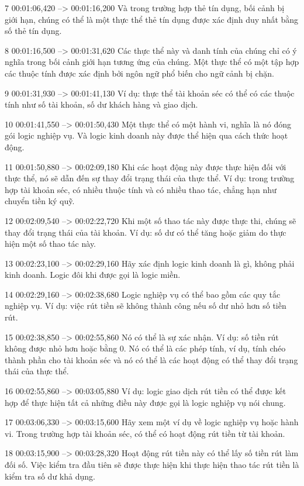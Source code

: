7
00:01:06,420 --> 00:01:16,200
Và trong trường hợp thẻ tín dụng, bối cảnh bị giới hạn, chúng có thể là một thực thể thẻ tín dụng được xác định duy nhất bằng số thẻ tín dụng.

8
00:01:16,500 --> 00:01:31,620
Các thực thể này và danh tính của chúng chỉ có ý nghĩa trong bối cảnh giới hạn tương ứng của chúng.  Một thực thể có một tập hợp các thuộc tính được xác định bởi ngôn ngữ phổ biến cho ngữ cảnh bị chặn.

9
00:01:31,930 --> 00:01:41,130
Ví dụ: thực thể tài khoản séc có thể có các thuộc tính như số tài khoản, số dư khách hàng và giao dịch.

10
00:01:41,550 --> 00:01:50,430
Một thực thể có một hành vi, nghĩa là nó đóng gói logic nghiệp vụ.  Và logic kinh doanh này được thể hiện qua cách thức hoạt động.

11
00:01:50,880 --> 00:02:09,180
Khi các hoạt động này được thực hiện đối với thực thể, nó sẽ dẫn đến sự thay đổi trạng thái của thực thể.  Ví dụ: trong trường hợp tài khoản séc, có nhiều thuộc tính và có nhiều thao tác, chẳng hạn như chuyển tiền ký quỹ.

12
00:02:09,540 --> 00:02:22,720
Khi một số thao tác này được thực thi, chúng sẽ thay đổi trạng thái của tài khoản.  Ví dụ: số dư có thể tăng hoặc giảm do thực hiện một số thao tác này.

13
00:02:23,100 --> 00:02:29,160
Hãy xác định logic kinh doanh là gì, không phải kinh doanh.  Logic đôi khi được gọi là logic miền.

14
00:02:29,160 --> 00:02:38,680
Logic nghiệp vụ có thể bao gồm các quy tắc nghiệp vụ.  Ví dụ: việc rút tiền sẽ không thành công nếu số dư nhỏ hơn số tiền rút.

15
00:02:38,850 --> 00:02:55,860
Nó có thể là sự xác nhận.  Ví dụ: số tiền rút không được nhỏ hơn hoặc bằng 0.  Nó có thể là các phép tính, ví dụ, tính chéo thành phần cho tài khoản séc và nó có thể là các hoạt động có thể thay đổi trạng thái của thực thể.

16
00:02:55,860 --> 00:03:05,880
Ví dụ: logic giao dịch rút tiền có thể được kết hợp để thực hiện tất cả những điều này được gọi là logic nghiệp vụ nói chung.

17
00:03:06,330 --> 00:03:15,600
Hãy xem một ví dụ về logic nghiệp vụ hoặc hành vi.  Trong trường hợp tài khoản séc, có thể có hoạt động rút tiền từ tài khoản.

18
00:03:15,900 --> 00:03:28,320
Hoạt động rút tiền này có thể lấy số tiền rút làm đối số.  Việc kiểm tra đầu tiên sẽ được thực hiện khi thực hiện thao tác rút tiền là kiểm tra số dư khả dụng.

